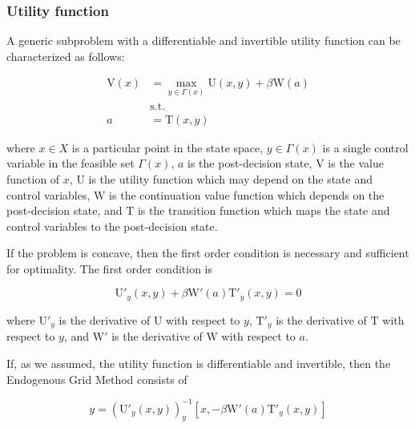 \documentclass{article}
\newcommand{\DiscFac}{\beta}
\newcommand{\VFunc}{\mathrm{V}}
\newcommand{\PGro}{\Gamma}
\newcommand{\aRat}{a}
\newcommand{\xRat}{x}
\newcommand{\TFunc}{\mathrm{T}}
\newcommand{\UFunc}{\mathrm{U}}
\newcommand{\WFunc}{\mathrm{W}}
\newcommand{\yRat}{y}
\newcommand{\XLev}{X}
\begin{document}
\subsubsection{Utility function}\label{Utility function}

A generic subproblem with a differentiable and invertible utility function can be characterized as follows:

\begin{equation}
\begin{split}
        \VFunc(\xRat) &  = \max_{\yRat  \in \PGro(\xRat)} \UFunc(\xRat, \yRat) + \DiscFac \WFunc(\aRat) \\
        & \text{s.t.} \\
        \aRat & = \TFunc(\xRat,\yRat)
    \end{split}
\end{equation}

where $\xRat \in \XLev$ is a particular point in the state space, $\yRat \in \PGro(\xRat)$ is a single control variable in the feasible set $\PGro(\xRat)$, $\aRat$ is the post-decision state, $\VFunc$ is the value function of $\xRat$, $\UFunc$ is the utility function which may depend on the state and control variables, $\WFunc$ is the continuation value function which depends on the post-decision state, and $\TFunc$ is the transition function which maps the state and control variables to the post-decision state.

If the problem is concave, then the first order condition is necessary and sufficient for optimality. The first order condition is

\begin{equation}
\UFunc'_{\yRat}(\xRat, \yRat) + \DiscFac \WFunc'(\aRat)\TFunc'_{\yRat}(\xRat,\yRat) = 0
\end{equation}

where $\UFunc'_{\yRat}$ is the derivative of $\UFunc$ with respect to $\yRat$, $\TFunc'_{\yRat}$ is the derivative of $\TFunc$ with respect to $\yRat$, and $\WFunc'$ is the derivative of $\WFunc$ with respect to $\aRat$.

If, as we assumed, the utility function is differentiable and invertible, then the Endogenous Grid Method consists of

\begin{equation}
\yRat = \left(\UFunc'_{\yRat}(\xRat, \yRat)\right)^{-1}_{\yRat} \left[ \xRat, - \DiscFac \WFunc'(\aRat) \TFunc'_{\yRat}(\xRat,\yRat)  \right]
\end{equation}
\end{document}
